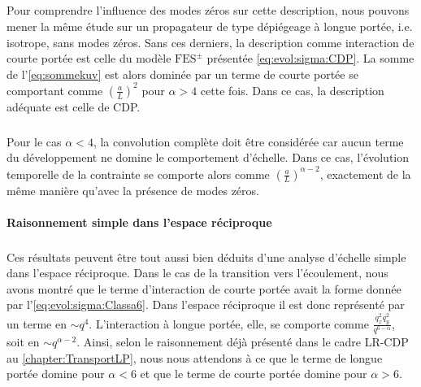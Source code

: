 \subparagraph{}Pour comprendre l'influence des modes zéros sur cette description, nous pouvons mener la même étude sur un propagateur de type dépiégeage à longue portée, i.e. isotrope, sans modes zéros. Sans ces derniers, la description comme interaction de courte portée est celle du modèle $\text{FES}^\pm$ présentée \autoref{eq:evol:sigma:CDP}. La somme de l'\autoref{eq:sommekuv} est alors dominée par un terme de courte portée se comportant comme $\left(  \frac{a}{L}\right)^2$ pour $\alpha>4$ cette fois. Dans ce cas, la description adéquate est celle de CDP.

\subparagraph{}Pour le cas $\alpha<4$, la convolution complète doit être considérée car aucun terme du développement ne domine le comportement d'échelle. Dans ce cas, l'évolution temporelle de la contrainte se comporte alors comme $\left(  \frac{a}{L}\right)^{\alpha-2}$, exactement de la même manière qu'avec la présence de modes zéros.

%
%

\paragraph{Raisonnement simple dans l'espace réciproque}

\subparagraph{}Ces résultats peuvent être tout aussi bien déduits d'une analyse d'échelle simple dans l'espace réciproque. Dans le cas de la transition vers l'écoulement, nous avons montré que le terme d'interaction de courte portée avait la forme donnée par l'\autoref{eq:evol:sigma:Classa6}. Dans l'espace réciproque il est donc représenté par un terme en $\sim q^4$. L'interaction à longue portée, elle, se comporte comme $\frac{q_x^2q_y^2}{q^{6-\alpha}}$, soit en $\sim q^{\alpha-2}$. Ainsi, selon le raisonnement déjà présenté dans le cadre LR-CDP au \autoref{chapter:TransportLP}, nous nous attendons à ce que le terme de longue portée domine pour $\alpha < 6$ et que le terme de courte portée domine pour $\alpha > 6$.

